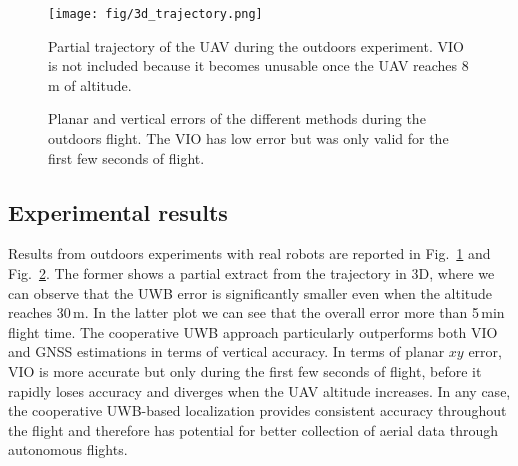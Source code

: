 \begin{figure}
    \centering
    \texttt{[image: fig/3d\_trajectory.png]}
    \caption{Partial trajectory of the UAV during the outdoors experiment. VIO is not included because it becomes unusable once the UAV reaches 8\,m of altitude.}
    \label{fig:trajectory}
\end{figure}


\begin{figure}
    \centering
    \setlength{}
    \setlength{}
    \scriptsize{}
    \caption{Planar and vertical errors of the different methods during the outdoors flight. The VIO has low error but was only valid for the first few seconds of flight.}
    \label{fig:uwb_vio_gps_err}
\end{figure}


\subsection{Experimental results}

Results from outdoors experiments with real robots are reported in Fig.~\ref{fig:trajectory} and Fig.~\ref{fig:uwb_vio_gps_err}. The former shows a partial extract from the trajectory in 3D, where we can observe that the UWB error is significantly smaller even when the altitude reaches 30\,m. In the latter plot we can see that the overall error more than 5\,min flight time. The cooperative UWB approach particularly outperforms both VIO and GNSS estimations in terms of vertical accuracy. In terms of planar $xy$ error, VIO is more accurate but only during the first few seconds of flight, before it rapidly loses accuracy and diverges when the UAV altitude increases. In any case, the cooperative UWB-based localization provides consistent accuracy throughout the flight and therefore has potential for better collection of aerial data through autonomous flights.



